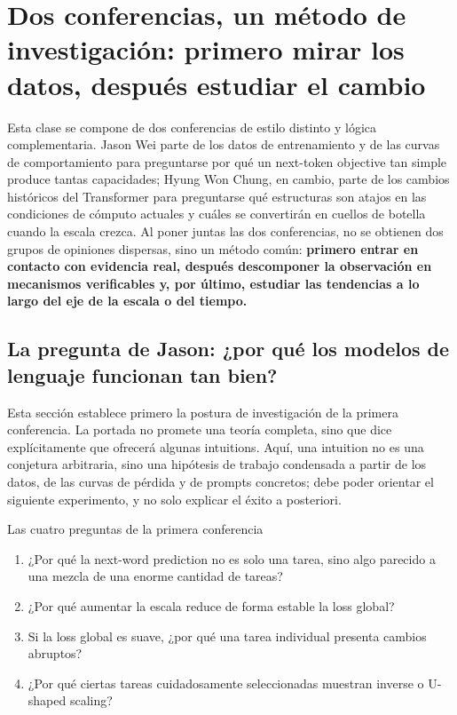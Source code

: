 \section{Dos conferencias, un método de investigación: primero mirar los datos, después estudiar el cambio}

Esta clase se compone de dos conferencias de estilo distinto y lógica complementaria. Jason Wei parte de los datos de entrenamiento y de las curvas de comportamiento para preguntarse por qué un next-token objective tan simple produce tantas capacidades; Hyung Won Chung, en cambio, parte de los cambios históricos del Transformer para preguntarse qué estructuras son atajos en las condiciones de cómputo actuales y cuáles se convertirán en cuellos de botella cuando la escala crezca. Al poner juntas las dos conferencias, no se obtienen dos grupos de opiniones dispersas, sino un método común: \textbf{primero entrar en contacto con evidencia real, después descomponer la observación en mecanismos verificables y, por último, estudiar las tendencias a lo largo del eje de la escala o del tiempo.}

\subsection{La pregunta de Jason: ¿por qué los modelos de lenguaje funcionan tan bien?}

Esta sección establece primero la postura de investigación de la primera conferencia. La portada no promete una teoría completa, sino que dice explícitamente que ofrecerá algunas intuitions. Aquí, una intuition no es una conjetura arbitraria, sino una hipótesis de trabajo condensada a partir de los datos, de las curvas de pérdida y de prompts concretos; debe poder orientar el siguiente experimento, y no solo explicar el éxito a posteriori.


\begin{importantbox}{Las cuatro preguntas de la primera conferencia}
\begin{enumerate}
  \item ¿Por qué la next-word prediction no es solo una tarea, sino algo parecido a una mezcla de una enorme cantidad de tareas?
  \item ¿Por qué aumentar la escala reduce de forma estable la loss global?
  \item Si la loss global es suave, ¿por qué una tarea individual presenta cambios abruptos?
  \item ¿Por qué ciertas tareas cuidadosamente seleccionadas muestran inverse o U-shaped scaling?
\end{enumerate}
\end{importantbox}

